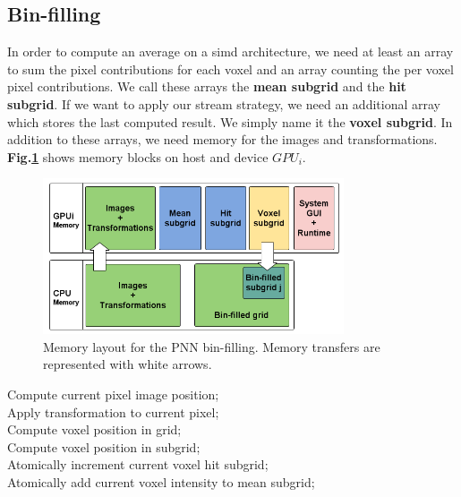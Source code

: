 \documentclass[12pt,journal,compsoc]{IEEEtran}
\begin{document}
\subsection{Bin-filling}
In order to compute an average on a \ac{simd} architecture, we need at least an array to sum the pixel contributions for each voxel and an array counting the per voxel pixel contributions.
We call these arrays the \textbf{mean subgrid} and the \textbf{hit subgrid}.
If we want to apply our stream strategy, we need an additional array which stores the last computed result.
We simply name it the \textbf{voxel subgrid}. 
In addition to these arrays, we need memory for the images and transformations.
\textbf{Fig.\ref{bin_filling_memory}} shows memory blocks on host and device $GPU_i$.
\vspace{0.5cm}
\begin{figure}[hb!]
\centering
\includegraphics[width=3.5in]{bin_filling_memory}
\caption{Memory layout for the PNN bin-filling. Memory transfers are represented with white arrows.}
\label{bin_filling_memory}
\end{figure}

\begin{algorithm}
\vspace{0.2cm}
Compute current pixel image position;\\
Apply transformation to current pixel;\\
Compute voxel position in grid;\\
Compute voxel position in subgrid;\\
Atomically increment current voxel hit subgrid;\\
Atomically add current voxel intensity to mean subgrid;\\
\caption{Bin-filling kernel (step 1).}
\label{bin_filling_kernel}
\end{algorithm}
\end{document}
